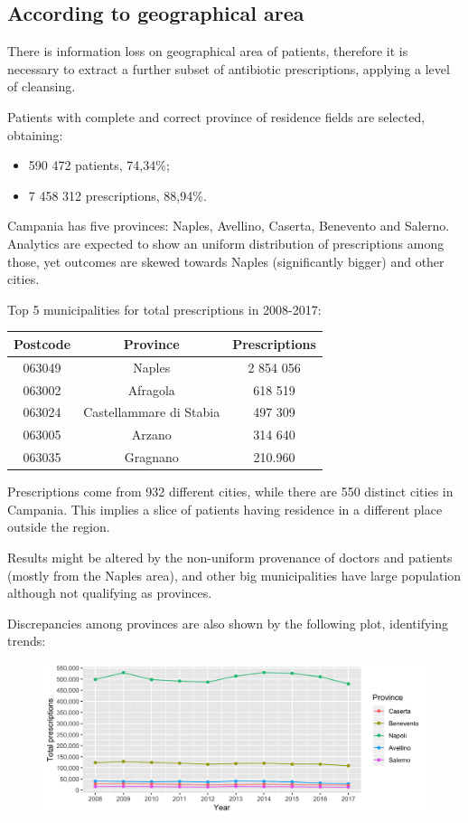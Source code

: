 \subsection{According to geographical area}
There is information loss on geographical area of patients, therefore it is necessary to extract a further subset of antibiotic prescriptions, applying a level of cleansing.

Patients with complete and correct province of residence fields are selected, obtaining:
\begin{itemize}
	\item 590 472 patients, 74,34\%;
	\item 7 458 312 prescriptions, 88,94\%.
\end{itemize}

Campania has five provinces: Naples, Avellino, Caserta, Benevento and Salerno. Analytics are expected to show an uniform distribution of prescriptions among those, yet outcomes are skewed towards Naples (significantly bigger) and other cities.

Top 5 municipalities for total prescriptions in 2008-2017:
\begin{center}
	\begin{tabular}{|c|c|c|}
		\hline
		Postcode & Province & Prescriptions \\
		\hline
		063049 & Naples & 2 854 056 \\
		\hline
		063002 & Afragola & 618 519 \\
		\hline
		063024 & Castellammare di Stabia & 497 309 \\
		\hline
		063005 & Arzano & 314 640 \\
		\hline
		063035 & Gragnano & 210.960 \\
		\hline
	\end{tabular}
\end{center}

Prescriptions come from 932 different cities, while there are 550 distinct cities in Campania. This implies a slice of patients having residence in a different place outside the region.

Results might be altered by the non-uniform provenance of doctors and patients (mostly from the Naples area), and other big municipalities have large population although not qualifying as provinces. 

Discrepancies among provinces are also shown by the following plot, identifying trends:
\begin{figure}[h]
	\centering
	\includegraphics[scale=0.3]{../plots/provinces.png}
\end{figure}

